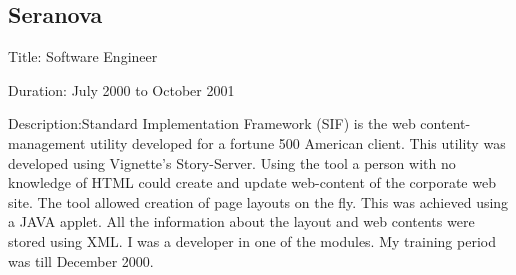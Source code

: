\documentclass [a4paper,11pt] {article}
\begin{document}
\subsection*{Seranova}
\begin{description}
\item{Title:} Software Engineer
\item{Duration:} July 2000 to October 2001
\item{Description:}Standard Implementation Framework (SIF) is the web content-management utility developed for a fortune 500 American client. This utility was developed using Vignette's Story-Server. Using the tool a person with no knowledge of HTML could create and update web-content of the corporate web site.  The tool allowed creation of page layouts on the fly. This was achieved using a JAVA applet. All the information about the layout and web contents were stored using XML. I was a developer in one of the modules. My training period was till December 2000.
\end{description}
\end{document}
